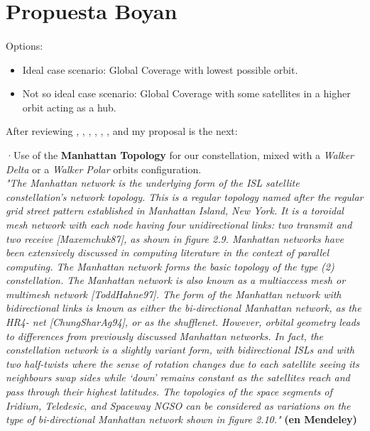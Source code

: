 \section{Propuesta Boyan}
	\paragraph{}
	Options:
	\begin{itemize}
		\item Ideal case scenario: Global Coverage with lowest possible orbit.
	\item Not so ideal case scenario: Global Coverage with some satellites in a higher orbit acting as a hub.
	\end{itemize}
After reviewing \cite{Wood1998}, \cite{Muri2012}, \cite{Horne2002}, \cite{Wood2001}, \cite{BookchapterinServiceEfficientNetworkInterconnectionviaSatellite2002}, 
\cite{Goodwin1998}, \cite{Sun2015} and \cite{Baumann} my proposal is the next:
\newline

·Use of the \textbf{Manhattan Topology} for our constellation, mixed with a \textit{Walker Delta} or a \textit{Walker Polar} orbits configuration.
\\


\textit{"The Manhattan network is the underlying form of the ISL satellite constellation’s
network topology. This is a regular topology named after the regular grid street
pattern established in Manhattan Island, New York. It is a toroidal mesh network with
each node having four unidirectional links: two transmit and two receive
[Maxemchuk87], as shown in figure 2.9.
Manhattan networks have been extensively discussed in computing literature in the
context of parallel computing. The Manhattan network forms the basic topology of the
type (2) constellation. The Manhattan network is also known as a multiaccess mesh or
multimesh network [ToddHahne97]. The form of the Manhattan network with bidirectional
links is known as either the bi-directional Manhattan network, as the HR4-
net [ChungSharAg94], or as the shufflenet.
However, orbital geometry leads to differences from previously discussed Manhattan networks. In fact, the constellation network is a slightly variant form, with bidirectional
ISLs and with two half-twists where the sense of rotation changes due to
each satellite seeing its neighbours swap sides while ‘down’ remains constant as the
satellites reach and pass through their highest latitudes. The topologies of the space
segments of Iridium, Teledesic, and Spaceway NGSO can be considered as variations
on the type of bi-directional Manhattan network shown in figure 2.10."}\cite[p. 32]{Wood2001} \textbf{(en Mendeley)}

